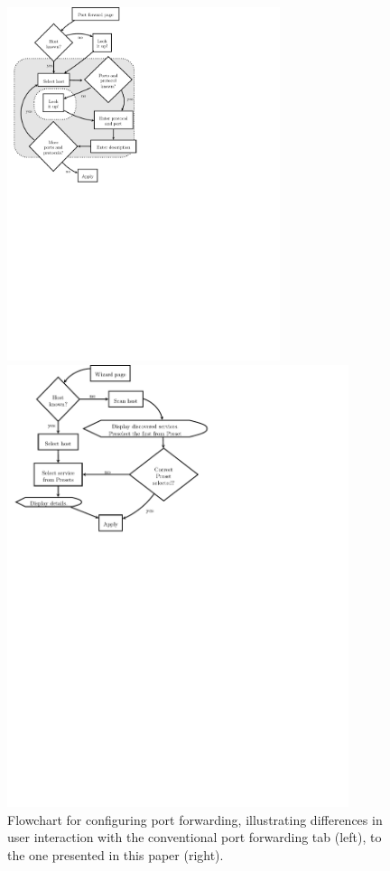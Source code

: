 \documentclass[a4paper,11pt,makeidx]{kth-bcs}
\begin{document}
\begin{figure}[h] %
   \begin{minipage}[b]{0.45\linewidth}
      \centering
      \includegraphics[trim = 4mm 140mm 90mm 0mm, clip, width=8cm,natwidth=2.570in,natheight=0.580in]{before}
   \end{minipage}
   \begin{minipage}[b]{0.45\linewidth}
      \centering
      \includegraphics[trim = 0mm 174mm 80mm 0mm, clip, width=10cm,natwidth=2.570in,natheight=0.580in]{after}
   \end{minipage}
   \caption{Flowchart for configuring port forwarding, illustrating differences in user interaction with the conventional port forwarding tab (left), to the one presented in this paper (right).}
   \label{fig:usability}
\end{figure}
\end{document}
